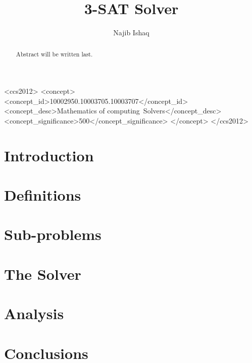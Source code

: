 \documentclass[sigchi]{acmart}
\begin{document}
\title{3-SAT Solver}

\author{Najib Ishaq}

\renewcommand{\shortauthors}{Najib}

\begin{abstract}
    Abstract will be written last.
\end{abstract}

\begin{CCSXML}
    <ccs2012>
    <concept>
    <concept_id>10002950.10003705.10003707</concept_id>
    <concept_desc>Mathematics of computing~Solvers</concept_desc>
    <concept_significance>500</concept_significance>
    </concept>
    </ccs2012>
\end{CCSXML}



\maketitle

\section{Introduction}
\label{sec:introduction}


\section{Definitions}
\label{sec:definitions}


\section{Sub-problems}
\label{sec:sub-problems}


\section{The Solver}
\label{sec:the-solver}


\section{Analysis}
\label{sec:analysis}


\section{Conclusions}
\label{sec:conclusions}




\end{document}
